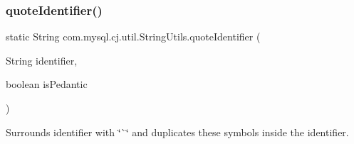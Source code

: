 \mbox{\label{classcom_1_1mysql_1_1cj_1_1util_1_1_string_utils_a5ed6d2efb949820c7dc4f24321a42ce6}} 
\subsubsection{\texorpdfstring{quote\+Identifier()}{quoteIdentifier()}\hspace{0.1cm}{\footnotesize\ttfamily [2/2]}}
{\footnotesize\ttfamily static String com.\+mysql.\+cj.\+util.\+String\+Utils.\+quote\+Identifier (\begin{DoxyParamCaption}\item[{String}]{identifier,  }\item[{boolean}]{is\+Pedantic }\end{DoxyParamCaption})\hspace{0.3cm}{\ttfamily [static]}}

Surrounds identifier with \char`\"{}\`{}\char`\"{} and duplicates these symbols inside the identifier.


